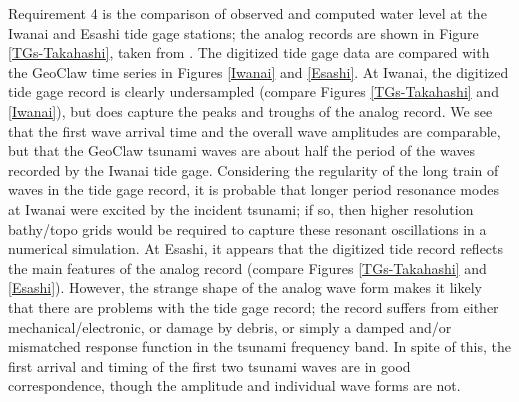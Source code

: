 Requirement 4 is the comparison of observed and computed water level at the Iwanai and Esashi tide gage stations; the analog records are shown in Figure \ref{TGs-Takahashi}, taken from \cite{TakahashiEtAl1995}.  The digitized tide gage data are compared with the GeoClaw time series in Figures \ref{Iwanai} and \ref{Esashi}.  At Iwanai, the digitized tide gage record is clearly undersampled (compare Figures \ref{TGs-Takahashi} and \ref{Iwanai}), but does capture the peaks and troughs of the analog record.  We see that the first wave arrival time and the overall wave amplitudes are comparable, but that the GeoClaw tsunami waves are about half the period of the waves recorded by the Iwanai tide gage.  Considering the regularity of the long train of waves in the tide gage record, it is probable that longer period resonance modes at Iwanai were excited by the incident tsunami; if so, then higher resolution bathy/topo grids would be required to capture these resonant oscillations in a numerical simulation.  At Esashi, it appears that the digitized tide record reflects the main features of the analog record (compare Figures \ref{TGs-Takahashi} and \ref{Esashi}).  However, the strange shape of the analog wave form makes it likely that there are problems with the tide gage record; the record suffers from either mechanical/electronic, or damage by debris, or simply a damped and/or mismatched response function in the tsunami frequency band.  In spite of this, the first arrival and timing of the first two tsunami waves are in good correspondence, though the amplitude and individual wave forms are not.


